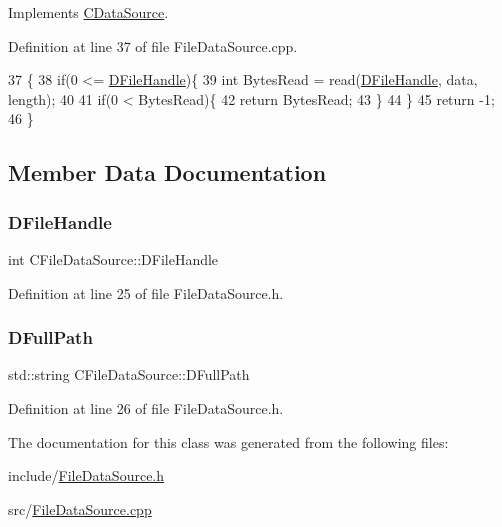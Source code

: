 Implements \hyperlink{classCDataSource_ad94adc5076f973dcce83b73395eec86b}{C\+Data\+Source}.



Definition at line 37 of file File\+Data\+Source.\+cpp.


\begin{DoxyCode}
37                                                \{
38     \textcolor{keywordflow}{if}(0 <= \hyperlink{classCFileDataSource_abad036de6dfe018ddc6160a2026a401d}{DFileHandle})\{
39         \textcolor{keywordtype}{int} BytesRead = read(\hyperlink{classCFileDataSource_abad036de6dfe018ddc6160a2026a401d}{DFileHandle}, data, length);
40         
41         \textcolor{keywordflow}{if}(0 < BytesRead)\{
42             \textcolor{keywordflow}{return} BytesRead;   
43         \}
44     \}
45     \textcolor{keywordflow}{return} -1;
46 \}
\end{DoxyCode}


\subsection{Member Data Documentation}
\hypertarget{classCFileDataSource_abad036de6dfe018ddc6160a2026a401d}{}\label{classCFileDataSource_abad036de6dfe018ddc6160a2026a401d} 
\subsubsection{\texorpdfstring{D\+File\+Handle}{DFileHandle}}
{\footnotesize\ttfamily int C\+File\+Data\+Source\+::\+D\+File\+Handle\hspace{0.3cm}{\ttfamily [protected]}}



Definition at line 25 of file File\+Data\+Source.\+h.

\hypertarget{classCFileDataSource_acf4e0d3f7c32cae09f91b7530e490aea}{}\label{classCFileDataSource_acf4e0d3f7c32cae09f91b7530e490aea} 
\subsubsection{\texorpdfstring{D\+Full\+Path}{DFullPath}}
{\footnotesize\ttfamily std\+::string C\+File\+Data\+Source\+::\+D\+Full\+Path\hspace{0.3cm}{\ttfamily [protected]}}



Definition at line 26 of file File\+Data\+Source.\+h.



The documentation for this class was generated from the following files\+:\begin{DoxyCompactItemize}
\item 
include/\hyperlink{FileDataSource_8h}{File\+Data\+Source.\+h}\item 
src/\hyperlink{FileDataSource_8cpp}{File\+Data\+Source.\+cpp}\end{DoxyCompactItemize}
